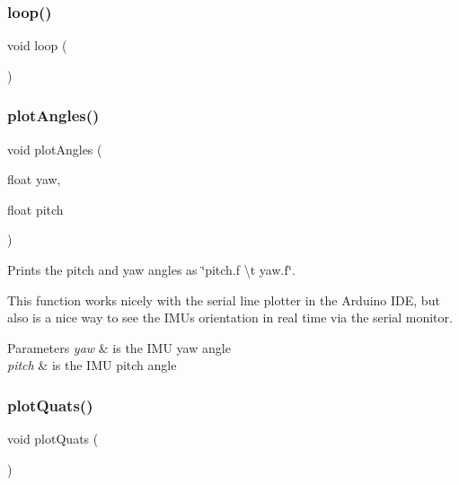 \subsubsection{loop()}
{\footnotesize\ttfamily void loop (\begin{DoxyParamCaption}{ }\end{DoxyParamCaption})}

\mbox{\label{_sat_trackr__combined__sketch_8c_adf540be30ede5cc6d14ab7d1cd346330}} 
\subsubsection{plot\+Angles()}
{\footnotesize\ttfamily void plot\+Angles (\begin{DoxyParamCaption}\item[{float}]{yaw,  }\item[{float}]{pitch }\end{DoxyParamCaption})}



Prints the pitch and yaw angles as \char`\"{}pitch.\+f \textbackslash{}t yaw.\+f\char`\"{}. 

This function works nicely with the serial line plotter in the Arduino I\+DE, but also is a nice way to see the I\+MU\textquotesingle{}s orientation in real time via the serial monitor. 
\begin{DoxyParams}{Parameters}
{\em yaw} & is the I\+MU yaw angle \\
\hline
{\em pitch} & is the I\+MU pitch angle \\
\hline
\end{DoxyParams}
\mbox{\label{_sat_trackr__combined__sketch_8c_abd2c91046cad8fbb76452242c3de68ce}} 
\subsubsection{plot\+Quats()}
{\footnotesize\ttfamily void plot\+Quats (\begin{DoxyParamCaption}{ }\end{DoxyParamCaption})}



